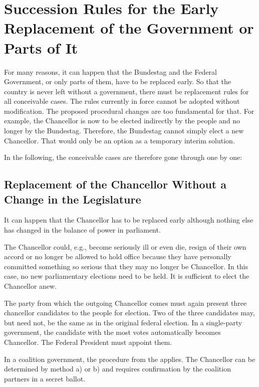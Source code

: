 \section{Succession Rules for the Early Replacement of the Government or Parts of It}\label{sec:succession_rules}

For many reasons, it can happen that the Bundestag and the Federal Government, or only parts of them,
have to be replaced early.
So that the country is never left without a government, there must be replacement rules for all conceivable cases.
The rules currently in force cannot be adopted without modification.
The proposed procedural changes are too fundamental for that.
For example, the Chancellor is now to be elected indirectly by the people and no longer by the Bundestag.
Therefore, the Bundestag cannot simply elect a new Chancellor.
That would only be an option as a temporary interim solution.

In the following, the conceivable cases are therefore gone through one by one:

\subsection{Replacement of the Chancellor Without a Change in the Legislature}\label{subsec:chancellor_replacement_without_legislative_change}
It can happen that the Chancellor has to be replaced early although nothing else has changed in the balance of power
in parliament.

The Chancellor could, e.g., become seriously ill or even die, resign of their own accord
or no longer be allowed to hold office because they have personally committed something so serious
that they may no longer be Chancellor.
In this case, no new parliamentary elections need to be held.
It is sufficient to elect the Chancellor anew.

The party from which the outgoing Chancellor comes must again present three chancellor candidates to the people for election.
Two of the three candidates may, but need not, be the same as in the original federal election.
In a single-party government, the candidate with the most votes automatically becomes Chancellor.
The Federal President must appoint them.

In a coalition government, the procedure from the  applies.
The Chancellor can be determined by method a) or b) and requires confirmation by the coalition partners
in a secret ballot.

